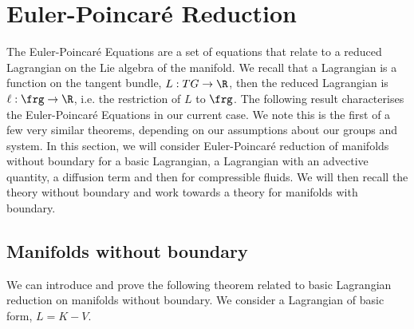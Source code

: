 

\section{Euler-Poincar\'e Reduction}
The Euler-Poincar\'e Equations are a set of equations that relate to a reduced Lagrangian on the Lie algebra of the manifold. We recall that a Lagrangian is a function on the tangent bundle, $L : TG \to \R$, then the reduced Lagrangian is $\ell : \frg \to \R$, i.e. the restriction of $L$ to $\frg$. The following result characterises the Euler-Poincar\'e Equations in our current case. We note this is the first of a few very similar theorems, depending on our assumptions about our groups and system. In this section, we will consider Euler-Poincar\'e reduction of manifolds without boundary for a basic Lagrangian, a Lagrangian with an advective quantity, a diffusion term and then for compressible fluids. We will then recall the theory without boundary and work towards a theory for manifolds with boundary.

\subsection{Manifolds without boundary}
We can introduce and prove the following theorem related to basic Lagrangian reduction on manifolds without boundary. We consider a Lagrangian of basic form, $L = K - V$.

